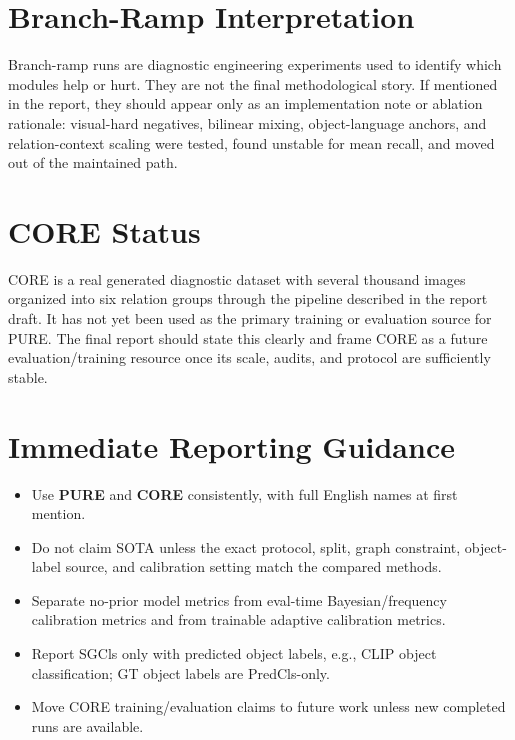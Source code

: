 \documentclass[11pt]{article}
\begin{document}
\section{Branch-Ramp Interpretation}
Branch-ramp runs are diagnostic engineering experiments used to identify which modules help or hurt. They are not the final methodological story. If mentioned in the report, they should appear only as an implementation note or ablation rationale: visual-hard negatives, bilinear mixing, object-language anchors, and relation-context scaling were tested, found unstable for mean recall, and moved out of the maintained path.

\section{CORE Status}
CORE is a real generated diagnostic dataset with several thousand images organized into six relation groups through the pipeline described in the report draft. It has not yet been used as the primary training or evaluation source for PURE. The final report should state this clearly and frame CORE as a future evaluation/training resource once its scale, audits, and protocol are sufficiently stable.

\section{Immediate Reporting Guidance}
\begin{itemize}[leftmargin=1.5em]
  \item Use \textbf{PURE} and \textbf{CORE} consistently, with full English names at first mention.
  \item Do not claim SOTA unless the exact protocol, split, graph constraint, object-label source, and calibration setting match the compared methods.
  \item Separate no-prior model metrics from eval-time Bayesian/frequency calibration metrics and from trainable adaptive calibration metrics.
  \item Report SGCls only with predicted object labels, e.g., CLIP object classification; GT object labels are PredCls-only.
  \item Move CORE training/evaluation claims to future work unless new completed runs are available.
\end{itemize}
\end{document}
